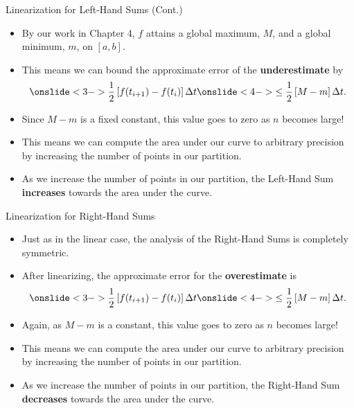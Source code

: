 \documentclass[Lecture.tex]{subfiles}
\begin{document}
\begin{frame}{Linearization for Left-Hand Sums (Cont.)}
  \begin{itemize}
  \item<1->
    By our work in Chapter 4, $f$ attains a global maximum, $M$, and a global minimum, $m$, on $[a,b]$. 
  \item<2->
    This means we can bound the approximate error of the {\bf underestimate} by
    $$\onslide<3->{\frac{1}{2}\left[f(t_{i+1}) - f(t_i)\right]\Delta t} \onslide<4->{ \leq \frac{1}{2}\left[M - m\right]\Delta t.}$$
  \item<5->
    Since $M - m$ is a fixed constant, this value goes to zero as $n$ becomes large!
  \item<6->
    This means we can compute the area under our curve to arbitrary precision by increasing the number of points in our partition.
  \item<7->
    As we increase the number of points in our partition, the Left-Hand Sum {\bf increases} towards the area under the curve.
  \end{itemize}
\end{frame}


\begin{frame}{Linearization for Right-Hand Sums}
  \begin{itemize}
  \item<1->
    Just as in the linear case, the analysis of the Right-Hand Sums is completely symmetric.
  \item<2->
    After linearizing, the approximate error for the {\bf overestimate} is 
    $$\onslide<3->{\frac{1}{2}\left[f(t_{i+1}) - f(t_i)\right]\Delta t} \onslide<4->{ \leq \frac{1}{2}\left[M - m\right]\Delta t.}$$
  \item<5->
    Again, as $M - m$ is a constant, this value goes to zero as $n$ becomes large!
  \item<6->
    This means we can compute the area under our curve to arbitrary precision by increasing the number of points in our partition.
  \item<7->
    As we increase the number of points in our partition, the Right-Hand Sum {\bf decreases} towards the area under the curve.
  \end{itemize}
\end{frame}
\end{document}

